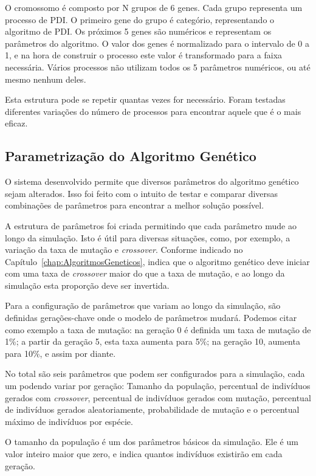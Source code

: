 \documentclass[12pt,oneside,a4paper,english,french,spanish,brazil,]{abntex2}
\begin{document}
O cromossomo é composto por N grupos de 6 genes. Cada grupo representa um processo de PDI. O primeiro gene do grupo é categório, representando o algoritmo de PDI. Os próximos 5 genes são numéricos e representam os parâmetros do algoritmo. O valor dos genes é normalizado para o intervalo de 0 a 1, e na hora de construir o processo este valor é transformado para a faixa necessária. Vários processos não utilizam todos os 5 parâmetros numéricos, ou até mesmo nenhum deles.

Esta estrutura pode se repetir quantas vezes for necessário. Foram testadas diferentes variações do número de processos para encontrar aquele que é o mais eficaz.

\subsection{Parametrização do Algoritmo Genético}

O sistema desenvolvido permite que diversos parâmetros do algoritmo genético sejam alterados. Isso foi feito com o intuito de testar e comparar diversas combinações de parâmetros para encontrar a melhor solução possível.

A estrutura de parâmetros foi criada permitindo que cada parâmetro mude ao longo da simulação. Isto é útil para diversas situações, como, por exemplo, a variação da taxa de mutação e \textit{crossover}. Conforme indicado no Capítulo~\ref{chap:AlgoritmosGeneticos}, \citet{linden:2008} indica que o algoritmo genético deve iniciar com uma taxa de \textit{crossover} maior do que a taxa de mutação, e ao longo da simulação esta proporção deve ser invertida.

Para a configuração de parâmetros que variam ao longo da simulação, são definidas gerações-chave onde o modelo de parâmetros mudará. Podemos citar como exemplo a taxa de mutação: na geração 0 é definida um taxa de mutação de 1\%; a partir da geração 5, esta taxa aumenta para 5\%; na geração 10, aumenta para 10\%, e assim por diante. 

No total são seis parâmetros que podem ser configurados para a simulação, cada um podendo variar por geração: Tamanho da população, percentual de indivíduos gerados com \textit{crossover}, percentual de indivíduos gerados com mutação, percentual de indivíduos gerados aleatoriamente, probabilidade de mutação e o percentual máximo de indivíduos por espécie.

O tamanho da população é um dos parâmetros básicos da simulação. Ele é um valor inteiro maior que zero, e indica quantos indivíduos existirão em cada geração.
\end{document}
